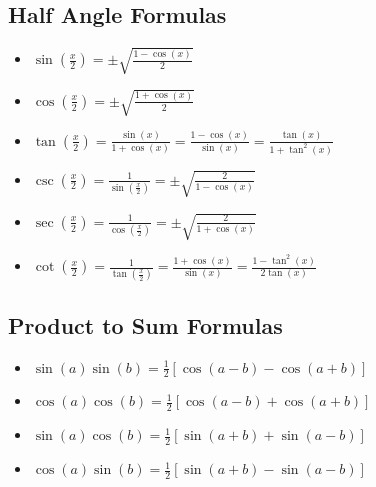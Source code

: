 \subsection{Half Angle Formulas}

\begin{itemize}

    \item \( \sin\left(\frac{x}{2}\right) = \pm\sqrt{\frac{1 - \cos(x)}{2}} \)

    \item \( \cos\left(\frac{x}{2}\right) = \pm\sqrt{\frac{1 + \cos(x)}{2}} \)

    \item \( \tan\left(\frac{x}{2}\right) = \frac{\sin(x)}{1 + \cos(x)} = \frac{1 - \cos(x)}{\sin(x)} = 
          \frac{\tan(x)}{1 + \tan^2(x)}\)

    \item \( \csc\left(\frac{x}{2}\right) = \frac{1}{\sin\left(\frac{x}{2}\right)} = 
          \pm\sqrt{\frac{2}{1 - \cos(x)}} \)

    \item \( \sec\left(\frac{x}{2}\right) = \frac{1}{\cos\left(\frac{x}{2}\right)} = 
          \pm\sqrt{\frac{2}{1 + \cos(x)}} \)

    \item \( \cot\left(\frac{x}{2}\right) = \frac{1}{\tan\left(\frac{x}{2}\right)} = 
          \frac{1 + \cos(x)}{\sin(x)} = \frac{1 - \tan^2(x)}{2\tan(x)}\)

\end{itemize}

\subsection{Product to Sum Formulas}

\begin{itemize}

    \item \( \sin(a)\sin(b) = \frac{1}{2}[\cos(a - b) - \cos(a + b)] \)

    \item \( \cos(a)\cos(b) = \frac{1}{2}[\cos(a - b) + \cos(a + b)] \)

    \item \( \sin(a)\cos(b) = \frac{1}{2}[\sin(a + b) + \sin(a - b)] \)

    \item \( \cos(a)\sin(b) = \frac{1}{2}[\sin(a + b) - \sin(a - b)] \)

\end{itemize}

